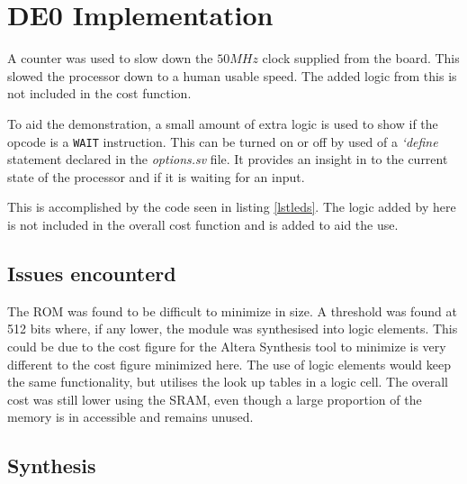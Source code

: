 
\section{DE0 Implementation}\label{sect:de0}



A counter was used to slow down the $50MHz$ clock supplied from the board. 
This slowed the processor down to a human usable speed.
The added logic from this is not included in the cost function.


To aid the demonstration, a small amount of extra logic is used to show if the opcode is a \texttt{WAIT} instruction. 
This can be turned on or off by used of a \textit{`define} statement declared in the \textit{options.sv} file.
It provides an insight in to the current state of the processor and if it is waiting for an input.

This is accomplished by the code seen in listing \ref{lstleds}.
The logic added by here is not included in the overall cost function and is added to aid the use. 




\subsection{Issues encounterd}

The ROM was found to be difficult to minimize in size. 
A threshold was found at 512 bits where, if any lower, the module was synthesised into logic elements. 
This could be due to the cost figure for the Altera Synthesis tool to minimize is very different to the cost figure minimized here. 
The use of logic elements would keep the same functionality, but utilises the look up tables in a logic cell. 
The overall cost was still lower using the SRAM, even though a large proportion of the memory is in accessible and remains unused.

\subsection{Synthesis}


